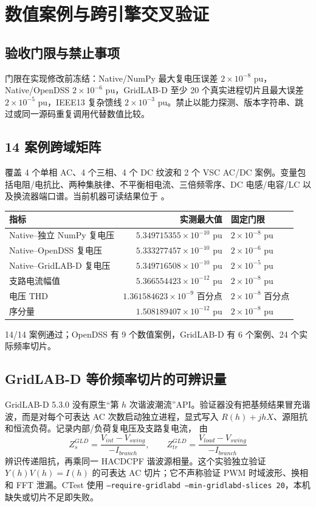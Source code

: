 \section{数值案例与跨引擎交叉验证}
\subsection{验收门限与禁止事项}
门限在实现修改前冻结：Native/NumPy 最大复电压误差 $2\times10^{-8}$ pu，Native/OpenDSS
$2\times10^{-6}$ pu，GridLAB-D 至少 20 个真实进程切片且最大误差 $2\times10^{-5}$ pu，IEEE13
复杂馈线 $2\times10^{-3}$ pu。禁止以能力探测、版本字符串、跳过或同一源码重复调用代替数值比较。

\subsection{14 案例跨域矩阵}
 覆盖 4 个单相 AC、4 个三相、4 个 DC
纹波和 2 个 VSC AC/DC 案例。变量包括电阻/电抗比、两种集肤律、不平衡相电流、三倍频零序、DC
电感/电容/LC 以及换流器端口谱。当前机器可读结果位于
。

\begin{center}\footnotesize
\begin{tabular}{@{}L{6.1cm}rL{4.1cm}@{}}\toprule
指标 & 实测最大值 & 固定门限\\ \midrule
Native--独立 NumPy 复电压 & $5.349715355\times10^{-10}$ pu & $2\times10^{-8}$ pu\\
Native--OpenDSS 复电压 & $5.333277457\times10^{-10}$ pu & $2\times10^{-6}$ pu\\
Native--GridLAB-D 复电压 & $5.349716508\times10^{-10}$ pu & $2\times10^{-5}$ pu\\
支路电流幅值 & $5.366554423\times10^{-12}$ pu & $2\times10^{-8}$ pu\\
电压 THD & $1.361584623\times10^{-9}$ 百分点 & $2\times10^{-8}$ 百分点\\
序分量 & $1.508189407\times10^{-12}$ pu & $2\times10^{-8}$ pu\\
\bottomrule\end{tabular}
\end{center}
14/14 案例通过；OpenDSS 有 9 个数值案例，GridLAB-D 有 6 个案例、24 个实际频率切片。

\subsection{GridLAB-D 等价频率切片的可辨识量}
GridLAB-D 5.3.0 没有原生“第 $h$ 次谐波潮流”API。验证器没有把基频结果冒充谐波，而是对每个可表达
AC 次数启动独立进程，显式写入 $R(h)+jhX$、源阻抗和恒流负荷。记录内部/负荷复电压及支路复电流，
由
\begin{equation}
Z_{s}^{GLD}=\frac{V_{int}-V_{swing}}{-I_{branch}},\qquad
Z_{tr}^{GLD}=\frac{V_{load}-V_{swing}}{-I_{branch}}
\end{equation}
辨识传递阻抗，再乘同一 HACDCPF 谐波源相量。这个实验独立验证 $Y(h)V(h)=I(h)$ 的可表达 AC
切片；它不声称验证 PWM 时域波形、换相和 FFT 泄漏。CTest 使用
\texttt{--require-gridlabd --min-gridlabd-slices 20}，本机缺失或切片不足即失败。

